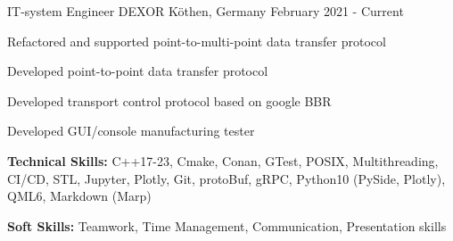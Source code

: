 

\begin{cventries}

  \cventry
    {IT-system Engineer} %
    {DEXOR} %
    {Köthen, Germany} %
    {February 2021 - Current} %
    {
      \begin{cvitems} %
        \item {Refactored and supported point-to-multi-point data transfer protocol}
        \item {Developed point-to-point data transfer protocol}
        \item {Developed transport control protocol based on google BBR}
        \item {Developed GUI/console manufacturing tester}
        \item {\textbf{Technical Skills:} C++17-23, Cmake, Conan, GTest, POSIX, Multithreading, CI/CD, STL, Jupyter, Plotly, Git, protoBuf, gRPC, Python10 (PySide, Plotly), QML6, Markdown (Marp)}
        \item {\textbf{Soft Skills:} Teamwork, Time Management, Communication, Presentation skills}
      \end{cvitems}
    }


\end{cventries}

